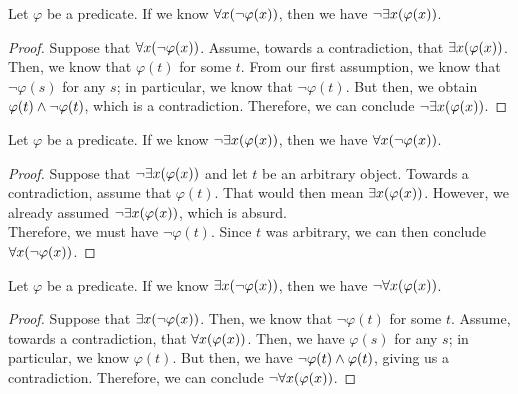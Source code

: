 \begin{lemma}\label{lem:forall}
    Let \(\varphi\) be a predicate.
    If we know \(\forall x \pn*{\neg \varphi(x)}\), then we have \(\neg \exists x \pn*{\varphi(x)}\).
\end{lemma}
\begin{proof}
    Suppose that \(\forall x \pn*{\neg \varphi(x)}\).
    Assume, towards a contradiction, that \(\exists x \pn*{\varphi(x)}\).
    Then, we know that \(\varphi(t)\) for some \(t\).
    From our first assumption, we know that \(\neg \varphi(s)\) for any \(s\);
    in particular, we know that \(\neg \varphi(t)\).
    But then, we obtain \(\varphi(t) \wedge \neg \varphi(t)\), which is a contradiction. \contradiction
    Therefore, we can conclude \(\neg \exists x \pn*{\varphi(x)}\).
\end{proof}

\begin{lemma}\label{lem:negexists}
    Let \(\varphi\) be a predicate.
    If we know \(\neg \exists x \pn*{\varphi(x)}\), then we have \(\forall x \pn*{\neg \varphi(x)}\).
\end{lemma}
\begin{proof}
    Suppose that \(\neg \exists x \pn*{\varphi(x)}\) and let \(t\) be an arbitrary object.
    Towards a contradiction, assume that \(\varphi(t)\).
    That would then mean \(\exists x \pn*{\varphi(x)}\).
    However, we already assumed \(\neg \exists x \pn*{\varphi(x)}\), which is absurd. \contradiction\\
    Therefore, we must have \(\neg \varphi(t)\).
    Since \(t\) was arbitrary, we can then conclude \(\forall x \pn*{\neg \varphi(x)}\).
\end{proof}

\begin{lemma}\label{lem:exists}
    Let \(\varphi\) be a predicate.
    If we know \(\exists x \pn*{\neg \varphi(x)}\), then we have \(\neg \forall x \pn*{\varphi(x)}\).
\end{lemma}
\begin{proof}
    Suppose that \(\exists x \pn*{\neg \varphi(x)}\).
    Then, we know that \(\neg \varphi(t)\) for some \(t\).
    Assume, towards a contradiction, that \(\forall x \pn*{\varphi(x)}\).
    Then, we have \(\varphi(s)\) for any \(s\);
    in particular, we know \(\varphi(t)\).
    But then, we have \(\neg \varphi(t) \wedge \varphi(t)\), giving us a contradiction. \contradiction
    Therefore, we can conclude \(\neg \forall x \pn*{\varphi(x)}\).
\end{proof}

